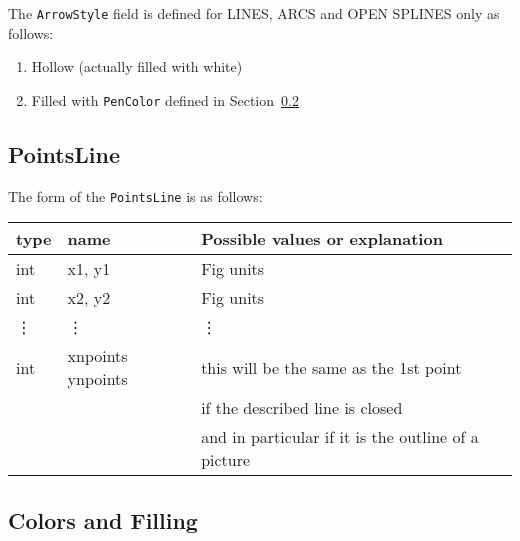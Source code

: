 \documentclass[10pt, a4paper]{article}%
\begin{document}
The \texttt{ArrowStyle} field is defined for LINES, ARCS and OPEN SPLINES only 
as follows:
%
\begin{enumerate}
\item[0] Hollow (actually filled with white)
\item    Filled with \texttt{PenColor} defined in Section~\ref{subsec:paramColorsFill}
\end{enumerate}


\subsection{PointsLine}\label{subsec:paramPointsLine}

\noindent
The form of the \texttt{PointsLine} is as follows: \\
%
\begin{tabular}{lll}
\toprule
type    & name             & Possible values or explanation \\
\midrule
\midrule
int    & x1, y1            & Fig units \\
int    & x2, y2            & Fig units \\
\vdots & \vdots            &  \vdots    \\
int    & xnpoints ynpoints & this will be the same as the 1st point \\
       &                   & if the described line is closed \\
       &                   & and in particular if it is the outline of a picture \\
\bottomrule
\end{tabular}

\subsection{Colors and Filling}\label{subsec:paramColorsFill}
\end{document}
